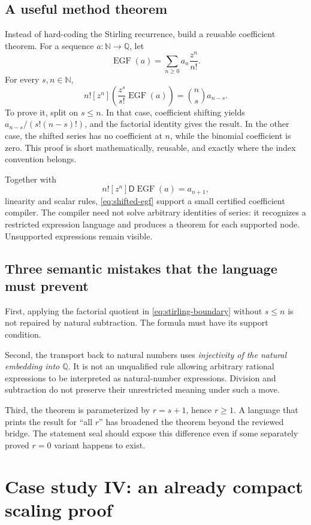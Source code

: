 \documentclass[11pt,a4paper]{article}
\newcommand{\N}{\mathbb N}
\newcommand{\Q}{\mathbb Q}
\newcommand{\Der}{\mathsf D}
\theoremstyle{remark}
\begin{document}
\subsection{A useful method theorem}

Instead of hard-coding the Stirling recurrence, build a reusable coefficient theorem. For a sequence $a:\N\to\Q$, let
\[
\operatorname{EGF}(a)=\sum_{n\ge0}a_n\frac{z^n}{n!}.
\]
For every $s,n\in\N$,
\begin{equation}
n![z^n]\left(\frac{z^s}{s!}\operatorname{EGF}(a)\right)
=\binom ns a_{n-s}.
\label{eq:shifted-egf}
\end{equation}
To prove it, split on $s\le n$. In that case, coefficient shifting yields $a_{n-s}/(s!(n-s)!)$, and the factorial identity gives the result. In the other case, the shifted series has no coefficient at $n$, while the binomial coefficient is zero. This proof is short mathematically, reusable, and exactly where the index convention belongs.

Together with
\[
n![z^n]\Der\operatorname{EGF}(a)=a_{n+1},
\]
linearity and scalar rules, \eqref{eq:shifted-egf} support a small certified coefficient compiler. The compiler need not solve arbitrary identities of series: it recognizes a restricted expression language and produces a theorem for each supported node. Unsupported expressions remain visible.

\subsection{Three semantic mistakes that the language must prevent}

First, applying the factorial quotient in \eqref{eq:stirling-boundary} without $s\le n$ is not repaired by natural subtraction. The formula must have its support condition.

Second, the transport back to natural numbers uses \emph{injectivity of the natural embedding into $\Q$}. It is not an unqualified rule allowing arbitrary rational expressions to be interpreted as natural-number expressions. Division and subtraction do not preserve their unrestricted meaning under such a move.

Third, the theorem is parameterized by $r=s+1$, hence $r\ge1$. A language that prints the result for ``all $r$'' has broadened the theorem beyond the reviewed bridge. The statement seal should expose this difference even if some separately proved $r=0$ variant happens to exist.

\section{Case study IV: an already compact scaling proof}
\label{sec:scaling}
\end{document}
